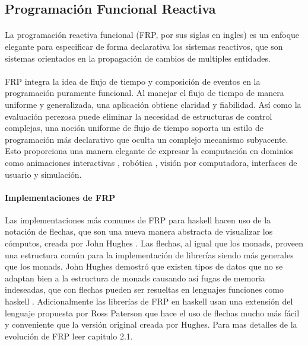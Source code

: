 \documentclass{standalone}
\begin{document}
\subsection{Programación Funcional Reactiva}

\paragraph{}
La programación reactiva funcional (FRP, por sus siglas en ingles) es un enfoque elegante para especificar de forma declarativa los sistemas reactivos, que son sistemas orientados en la propagación de cambios de multiples entidades.

\paragraph{}
FRP integra la idea de flujo de tiempo y composición de eventos en la programación puramente funcional. Al manejar el flujo de tiempo de manera uniforme y generalizada, una aplicación obtiene claridad y fiabilidad. Así como la evaluación perezosa puede eliminar la necesidad de estructuras de control complejas, una noción uniforme de flujo de tiempo soporta un estilo de programación más declarativo que oculta un complejo mecanismo subyacente. Esto proporciona una manera elegante de expresar la computación en dominios como animaciones interactivas \cite{eh97:fran}, robótica \cite{Pembeci:2002:FRR:571157.571174}, visión por computadora, interfaces de usuario \cite{czaplicki2012elm} y simulación.

\paragraph{Implementaciones de FRP}
Las implementaciones más comunes de FRP para haskell  hacen uso de la notación de flechas, que son una nueva manera abstracta de visualizar los cómputos, creada por John Hughes \cite{hughes2000generalising}. Las flechas, al igual que los monads, proveen una estructura común para la implementación de librerías siendo más generales que los monads. John Hughes demostró que existen tipos de datos que no se adaptan bien a la estructura de monads causando así fugas de memoria indeseadas, que con flechas pueden ser resueltas en lenguajes funciones como haskell \cite{hughes2000generalising}. Adicionalmente las librerías de FRP en haskell usan una extensión del lenguaje propuesta por Ross  Paterson \cite{paterson2001new} que hace el uso de flechas mucho más fácil y conveniente que la versión original creada por Hughes. Para mas detalles de la evolución de FRP leer  \cite{czaplicki2012elm} capitulo 2.1.
\end{document}
